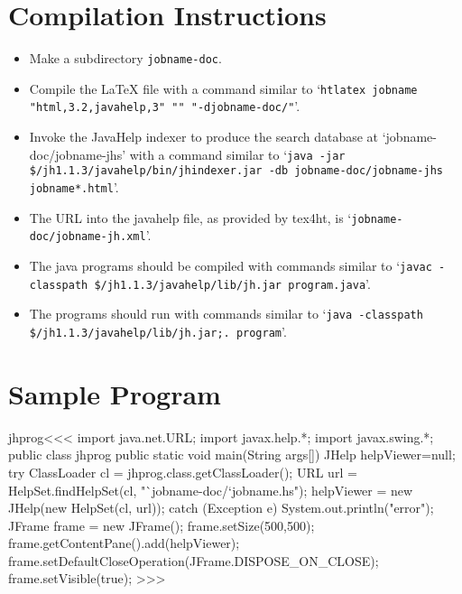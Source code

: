 \documentclass{article}
\begin{document}
\tableofcontents

\section{Compilation Instructions}

\begin{itemize}
\item
Make a subdirectory {\tt jobname-doc}.
\item
Compile the \LaTeX{} file with a command similar to
%
`{\tt htlatex
jobname "html,3.2,javahelp,3" "" "-djobname-doc/"}'.
\item
{}%
  Invoke the JavaHelp indexer to produce the search
database at `jobname-doc/jobname-jhs' with a command
 similar to `{\tt java -jar
   \$/jh1.1.3/javahelp/bin/jhindexer.jar -db
   jobname-doc/jobname-jhs
jobname*.html}'.
\item
{}%
The URL into the javahelp file, as provided by tex4ht, is
`{\tt jobname-doc/jobname-jh.xml}'.
\item
The java programs should be compiled with commands  similar to
%
`{\tt javac -classpath
  \$/jh1.1.3/javahelp/lib/jh.jar program.java}'.
\item
The programs should run with commands similar to
%
`{\tt java -classpath
  \$/jh1.1.3/javahelp/lib/jh.jar;. program}'.
\end{itemize}




\section{Sample Program}

\<jhprog\><<<
import java.net.URL;
import javax.help.*;
import javax.swing.*;
public class jhprog {
   public static void main(String args[]) {
      JHelp helpViewer=null;
      try {
         ClassLoader cl = jhprog.class.getClassLoader();
         URL url = HelpSet.findHelpSet(cl,
                              "`jobname-doc/`jobname.hs");
         helpViewer = new JHelp(new HelpSet(cl, url));
      } catch (Exception e) { System.out.println("error");
      }
      JFrame frame = new JFrame();
      frame.setSize(500,500);
      frame.getContentPane().add(helpViewer);
      frame.setDefaultCloseOperation(JFrame.DISPOSE_ON_CLOSE);
      frame.setVisible(true);
   }
}
>>>
\end{document}

